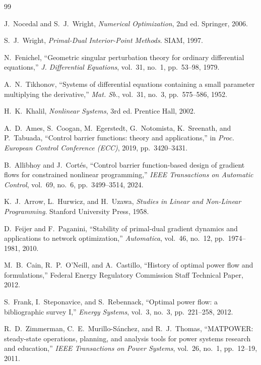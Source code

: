 \documentclass[11pt,onecolumn]{article}
\theoremstyle{definition}
\theoremstyle{remark}
\begin{document}
\begin{thebibliography}{99}

 J.~Nocedal and S.~J.~Wright, \emph{Numerical Optimization}, 2nd ed.
  Springer, 2006.

 S.~J.~Wright, \emph{Primal-Dual Interior-Point Methods}. SIAM, 1997.

 N.~Fenichel, ``Geometric singular perturbation theory for ordinary
  differential equations,'' \emph{J. Differential Equations}, vol.~31, no.~1, pp.~53--98, 1979.

 A.~N.~Tikhonov, ``Systems of differential equations containing a small
  parameter multiplying the derivative,'' \emph{Mat. Sb.}, vol.~31, no.~3, pp.~575--586, 1952.

 H.~K.~Khalil, \emph{Nonlinear Systems}, 3rd ed. Prentice Hall, 2002.

 A.~D.~Ames, S.~Coogan, M.~Egerstedt, G.~Notomista, K.~Sreenath, and
  P.~Tabuada, ``Control barrier functions: theory and applications,'' in \emph{Proc. European
  Control Conference (ECC)}, 2019, pp.~3420--3431.

 B.~Allibhoy and J.~Cort\'es, ``Control barrier function-based design of
  gradient flows for constrained nonlinear programming,'' \emph{IEEE Transactions on Automatic
  Control}, vol.~69, no.~6, pp.~3499--3514, 2024.

 K.~J.~Arrow, L.~Hurwicz, and H.~Uzawa, \emph{Studies in Linear and
  Non-Linear Programming}. Stanford University Press, 1958.

 D.~Feijer and F.~Paganini, ``Stability of primal-dual gradient dynamics
  and applications to network optimization,'' \emph{Automatica}, vol.~46, no.~12,
  pp.~1974--1981, 2010.

 M.~B.~Cain, R.~P.~O'Neill, and A.~Castillo, ``History of optimal power flow
  and formulations,'' Federal Energy Regulatory Commission Staff Technical Paper, 2012.

 S.~Frank, I.~Steponavice, and S.~Rebennack, ``Optimal power flow: a
  bibliographic survey I,'' \emph{Energy Systems}, vol.~3, no.~3, pp.~221--258, 2012.

 R.~D.~Zimmerman, C.~E.~Murillo-S\'anchez, and R.~J.~Thomas,
  ``MATPOWER: steady-state operations, planning, and analysis tools for power systems research
  and education,'' \emph{IEEE Transactions on Power Systems}, vol.~26, no.~1, pp.~12--19, 2011.


\end{thebibliography}
\end{document}
